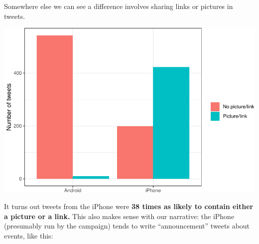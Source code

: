 \documentclass[
]{article}
\newenvironment{Shaded}{\begin{snugshade}}{\end{snugshade}}
\newcommand{\DataTypeTok}[1]{\textcolor[rgb]{0.13,0.29,0.53}{#1}}
\newcommand{\KeywordTok}[1]{\textcolor[rgb]{0.13,0.29,0.53}{\textbf{#1}}}
\newcommand{\NormalTok}[1]{#1}
\newcommand{\OperatorTok}[1]{\textcolor[rgb]{0.81,0.36,0.00}{\textbf{#1}}}
\newcommand{\StringTok}[1]{\textcolor[rgb]{0.31,0.60,0.02}{#1}}
\begin{document}
Somewhere else we can see a difference involves sharing links or
pictures in tweets.

\begin{Shaded}
\end{Shaded}

\includegraphics{Live_Demo_files/figure-latex/unnamed-chunk-4-1.pdf}

It turns out tweets from the iPhone were \textbf{38 times as likely to
contain either a picture or a link.} This also makes sense with our
narrative: the iPhone (presumably run by the campaign) tends to write
``announcement'' tweets about events, like this:
\end{document}
